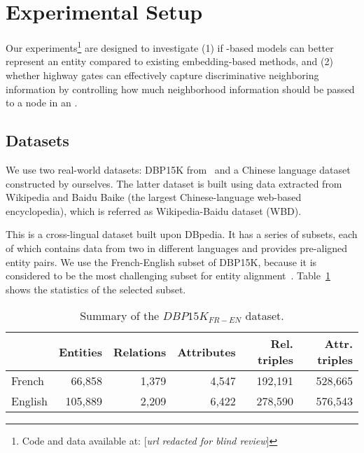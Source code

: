 \section{Experimental Setup}
	Our experiments\footnote{Code and data available at: [\emph{url redacted for blind review}]} are designed to investigate (1) if \RGCN-based models can better represent an entity compared to existing \KG
embedding-based methods, and (2) whether highway gates can effectively capture discriminative neighboring information by controlling how
much neighborhood information should be passed to a node in an \RGCN.

\subsection{Datasets}
\label{subsection:datasets}
	We use two real-world datasets: DBP15K from~\cite{sun2017cross} and a Chinese language dataset constructed by ourselves. The latter
dataset is built using data extracted from Wikipedia and Baidu Baike (the largest Chinese-language web-based encyclopedia), which is
referred as Wikipedia-Baidu dataset (WBD).
	
	 This is a cross-lingual dataset built upon DBpedia.
	It has a series of subsets, each of which contains data from two \KGs in different languages and provides pre-aligned entity pairs.
	We use the French-English subset of DBP15K, because it is considered to be the most challenging subset for entity alignment~\cite{sun2017cross}. Table~\ref{dbp} shows the statistics of the selected subset.
	
		\begin{table}
		\centering
		\scriptsize
		\begin{tabular}{l|rrrrr}
			\toprule
			&\bf  Entities &\bf  Relations &\bf  Attributes &\bf  Rel. triples &\bf  Attr. triples \\
			\midrule
			French & 66,858 & 1,379 & 4,547 & 192,191 & 528,665 \\
			English & 105,889 & 2,209 & 6,422 & 278,590 & 576,543 \\
			\bottomrule
		\end{tabular}
		\caption{Summary of the $DBP15K_{FR-EN}$ dataset.}
		\label{dbp}
	\end{table}
	
%	
%	
	
